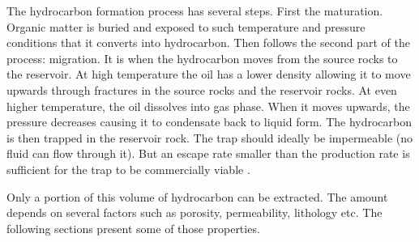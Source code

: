 The hydrocarbon formation process has several steps. First the maturation. Organic matter is buried and exposed to such temperature and pressure conditions that it converts into hydrocarbon.  Then follows the second part of the process: migration. It is when the hydrocarbon moves from the source rocks to the reservoir. At high temperature the oil has a lower density allowing it to move upwards through fractures in the source rocks and the reservoir rocks. At even higher temperature, the oil dissolves into gas phase. When it moves upwards, the pressure decreases causing it to condensate back to liquid form. The hydrocarbon is then trapped in the reservoir rock. The trap should ideally be impermeable (no fluid can flow through it). But an escape rate smaller than the production rate is sufficient for the trap to be commercially viable \cite{oilbegin}. 

Only a portion of this volume of hydrocarbon can be extracted. The amount depends on several factors such as porosity, permeability, lithology etc.  The following sections present some of those properties. 
